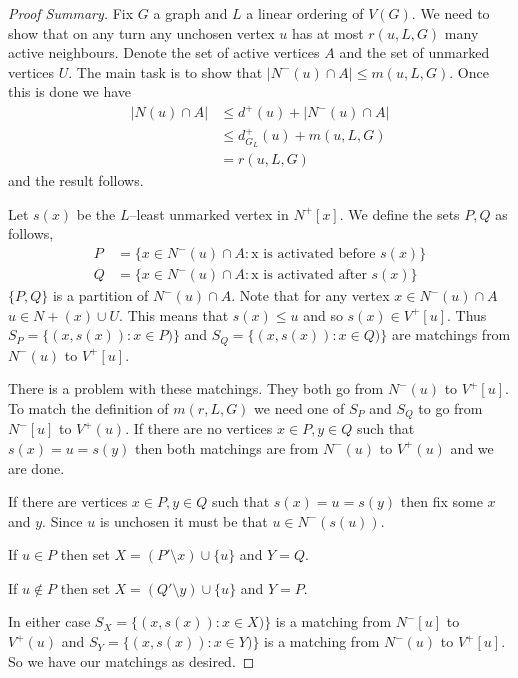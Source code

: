 \begin{proof}[Proof Summary]
    Fix $G$ a graph and $L$ a linear ordering of $V(G)$. We need to show that on any turn any unchosen vertex $u$ has at most $r(u,L,G)$ many active neighbours. Denote the set of active vertices $A$ and the set of unmarked vertices $U$. The main task is to show that $|N^-(u)\cap A|\leq m(u,L,G)$. Once this is done we have 
    \begin{align*}
        |N(u)\cap A| &\leq d^+(u) + |N^-(u)\cap A| \\
        & \leq  d^+_{G_L}(u) + m(u,L,G) \\
        & = r(u,L,G)
    \end{align*} 
    and the result follows.
    
    Let $s(x)$ be the $L$--least unmarked vertex in $N^+[x]$. We define the sets $P,Q$ as follows,
    \begin{align*}
        P&=\{x\in N^-(u)\cap A : \text{x is activated before $s(x)$}\} \\        
        Q&=\{x\in N^-(u)\cap A : \text{x is activated after $s(x)$}\}
    \end{align*}
    $\{P,Q\}$ is a partition of $N^-(u)\cap A$. Note that for any vertex $x\in N^-(u)\cap A $ $u\in N+(x)\cup U$. This means that $s(x)\leq u$ and so $s(x)\in V^+[u]$. Thus $S_P = \{(x,s(x)):x\in P)\}$ and $S_Q = \{(x,s(x)):x\in Q)\}$ are matchings from $N^-(u)$ to $V^+[u]$.
    
    There is a problem with these matchings. They both go from $N^-(u)$ to $V^+[u]$. To match the definition of $m(r,L,G)$ we need one of $S_P$ and $S_Q$ to go from $N^-[u]$ to $V^+(u)$. If there are no vertices $x\in P, y\in Q$ such that $s(x)=u=s(y)$ then both matchings are from $N^-(u)$ to $V^+(u)$ and we are done. 
    
    If there are vertices $x\in P, y\in Q$ such that $s(x)=u=s(y)$ then fix some $x$ and $y$. Since $u$ is unchosen it must be that $u \in N^-(s(u))$. 
    
    If $u\in P$ then set $X = (P'\setminus x) \cup\{u\}$ and $Y= Q$. 
    
    If $u\notin P$ then set $X = (Q'\setminus y) \cup\{u\}$ and $Y= P$.
    
    In either case $S_X= \{(x,s(x)):x\in X)\}$ is a matching from $N^-[u]$ to $V^+(u)$ and $S_Y= \{(x,s(x)):x\in Y)\}$ is a matching from $N^-(u)$ to $V^+[u]$. So we have our matchings as desired.
\end{proof}


